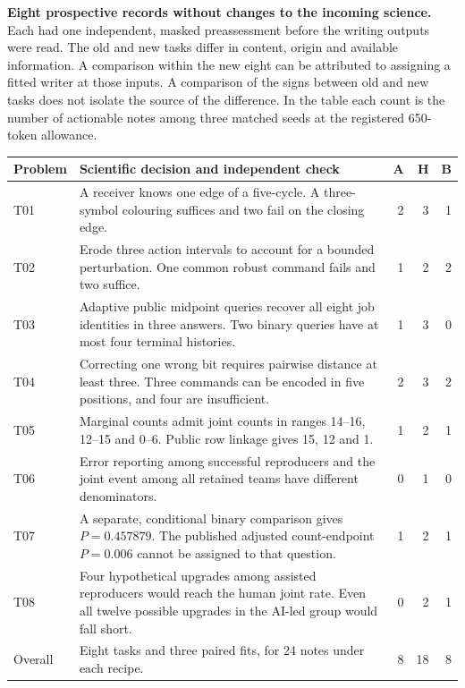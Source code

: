 \documentclass[11pt,a4paper]{article}
\newcommand{\lead}[1]{\textbf{#1}\enspace}
\begin{document}
\lead{Eight prospective records without changes to the incoming science.} Each had one independent, masked preassessment before the writing outputs were read. The old and new tasks differ in content, origin and available information. A comparison within the new eight can be attributed to assigning a fitted writer at those inputs. A comparison of the signs between old and new tasks does not isolate the source of the difference. In the table each count is the number of actionable notes among three matched seeds at the registered 650-token allowance.

\begin{center}\small
\begin{tabular}{p{19mm}p{85mm}rrr}
\toprule Problem & Scientific decision and independent check & A & H & B\\\midrule
T01 & A receiver knows one edge of a five-cycle. A three-symbol colouring suffices and two fail on the closing edge. & 2 & 3 & 1\\
T02 & Erode three action intervals to account for a bounded perturbation. One common robust command fails and two suffice. & 1 & 2 & 2\\
T03 & Adaptive public midpoint queries recover all eight job identities in three answers. Two binary queries have at most four terminal histories. & 1 & 3 & 0\\
T04 & Correcting one wrong bit requires pairwise distance at least three. Three commands can be encoded in five positions, and four are insufficient. & 2 & 3 & 2\\
T05 & Marginal counts admit joint counts in ranges 14--16, 12--15 and 0--6. Public row linkage gives 15, 12 and 1. & 1 & 2 & 1\\
T06 & Error reporting among successful reproducers and the joint event among all retained teams have different denominators. & 0 & 1 & 0\\
T07 & A separate, conditional binary comparison gives \(P=0.457879\). The published adjusted count-endpoint \(P=0.006\) cannot be assigned to that question. & 1 & 2 & 1\\
T08 & Four hypothetical upgrades among assisted reproducers would reach the human joint rate. Even all twelve possible upgrades in the AI-led group would fall short. & 0 & 2 & 1\\\midrule
Overall & Eight tasks and three paired fits, for 24 notes under each recipe. & 8 & 18 & 8\\\bottomrule
\end{tabular}
\end{center}
\end{document}
